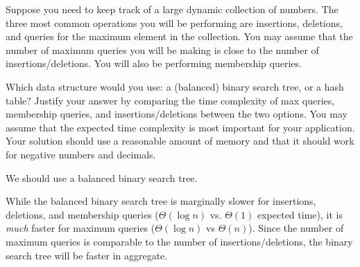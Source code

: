 \begin{prob}[\eligible]
    Suppose you need to keep track of a large dynamic collection of numbers.
    The three most common operations you will be performing are insertions, deletions,
    and queries for the maximum element in the collection. You may assume that the number
    of maximum queries you will be making is close to the number of insertions/deletions.
    You will also be performing membership queries.

    Which data structure would you use:
    a (balanced) binary search tree, or a hash table?  Justify your answer by
    comparing the time complexity of max queries, membership queries, and
    insertions/deletions between the two options.  You may assume that the expected
    time complexity is most important for your application. Your solution should use 
    a reasonable amount of memory and that it should work for negative numbers and decimals.

    \begin{soln}
        We should use a balanced binary search tree.

        While the balanced binary search tree is marginally slower for insertions,
        deletions, and membership queries ($\Theta(\log n)$ vs. $\Theta(1)$ expected time), it is
        \emph{much} faster for maximum queries ($\Theta(\log n)$ vs $\Theta(n)$). 
        Since the number of maximum queries is comparable to the number of insertions/deletions,
        the binary search tree will be faster in aggregate.
    \end{soln}

\end{prob}
